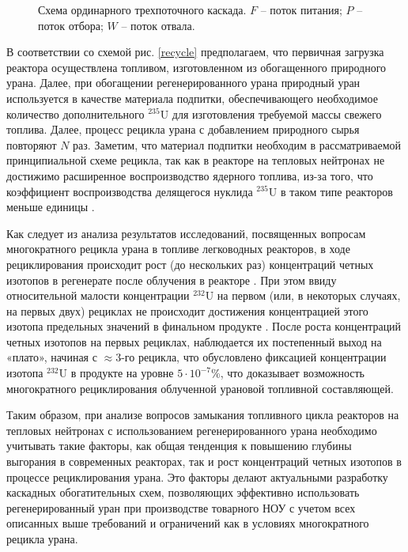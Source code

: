 \begin{figure}[ht]
  \caption{Схема ординарного трехпоточного каскада. $F$ -- поток питания; $P$ -- поток отбора; $W$ -- поток отвала.}\label{ordinary}
\end{figure}

В соответствии со схемой рис. \ref{recycle} предполагаем, что первичная загрузка реактора осуществлена топливом, изготовленном из обогащенного природного урана. Далее, при обогащении регенерированного урана природный уран используется в качестве материала подпитки, обеспечивающего необходимое количество дополнительного $^{235}$U для изготовления требуемой массы свежего топлива. Далее, процесс рецикла урана с добавлением природного сырья повторяют $N$ раз. Заметим, что материал подпитки необходим в рассматриваемой принципиальной схеме рецикла, так как в реакторе на тепловых нейтронах не достижимо расширенное воспроизводство ядерного топлива, из-за того, что коэффициент воспроизводства делящегося нуклида $^{235}$U в таком типе реакторов меньше единицы \cite{ignatevVliyanieVidaTopliva2020}. 


Как следует из анализа результатов исследований, посвященных вопросам многократного рецикла урана в топливе легководных реакторов, в ходе рециклирования происходит рост (до нескольких раз) концентраций четных изотопов в регенерате после облучения в реакторе \cite{smirnovEvolutionIsotopicComposition2012}. При этом ввиду относительной малости концентрации $^{232}$U на первом (или, в некоторых случаях, на первых двух) рециклах не происходит достижения концентрацией этого изотопа предельных значений в финальном продукте \cite{smirnovApplyingEnrichmentCapacities2018}.
После роста концентраций четных изотопов на первых рециклах, наблюдается их постепенный выход на «плато», начиная с $\approx$3-го рецикла, что обусловлено фиксацией концентрации изотопа $^{232}$U в продукте на уровне $5\cdot10^{-7}$\%, что доказывает возможность многократного рециклирования облученной урановой топливной составляющей.

Таким образом, при анализе вопросов замыкания топливного цикла реакторов на тепловых нейтронах с использованием регенерированного урана необходимо учитывать такие факторы, как общая тенденция к повышению глубины выгорания в современных реакторах, так и рост концентраций четных изотопов в процессе рециклирования урана. Это факторы делают актуальными разработку каскадных обогатительных схем, позволяющих эффективно использовать регенерированный уран при производстве товарного НОУ с учетом всех описанных выше требований и ограничений как в условиях многократного рецикла урана.

